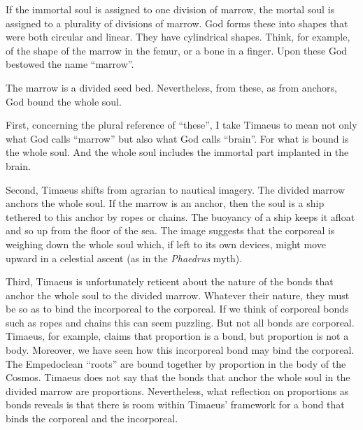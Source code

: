 If the immortal soul is assigned to one division of marrow, the mortal soul is assigned to a plurality of divisions of marrow. God forms these into shapes that were both circular and linear. They have cylindrical shapes. Think, for example, of the shape of the marrow in the femur, or a bone in a finger. Upon these God bestowed the name ``marrow''.

The marrow is a divided seed bed. Nevertheless, from these, as from anchors, God bound the whole soul.

First, concerning the plural reference of ``these'', I take Timaeus to mean not only what God calls ``marrow'' but also what God calls ``brain''. For what is bound is the whole soul. And the whole soul includes the immortal part implanted in the brain.

Second, Timaeus shifts from agrarian to nautical imagery. The divided marrow anchors the whole soul. If the marrow is an anchor, then the soul is a ship tethered to this anchor by ropes or chains. The buoyancy of a ship keeps it afloat and so up from the floor of the sea. The image suggests that the corporeal is weighing down the whole soul which, if left to its own devices, might move upward in a celestial ascent (as in the \emph{Phaedrus} myth).

Third, Timaeus is unfortunately reticent about the nature of the bonds that anchor the whole soul to the divided marrow. Whatever their nature, they must be so as to bind the incorporeal to the corporeal. If we think of corporeal bonds such as ropes and chains this can seem puzzling. But not all bonds are corporeal. Timaeus, for example, claims that proportion is a bond, but proportion is not a body. Moreover, we have seen how this incorporeal bond may bind the corporeal. The Empedoclean ``roots'' are bound together by proportion in the body of the Cosmos. Timaeus does not say that the bonds that anchor the whole soul in the divided marrow are proportions. Nevertheless, what reflection on proportions as bonds reveals is that there is room within Timaeus' framework for a bond that binds the corporeal and the incorporeal.

